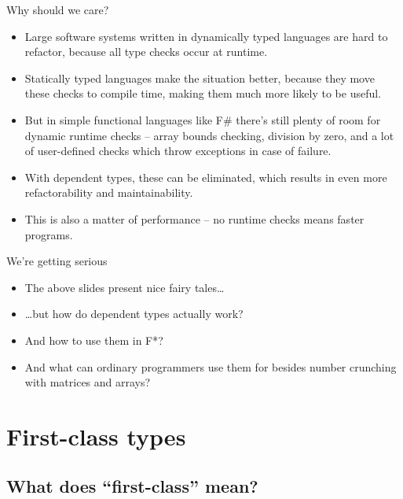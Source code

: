 \documentclass{beamer}
\begin{document}
\begin{frame}{Why should we care?}
\begin{itemize}
	\item Large software systems written in dynamically typed languages are hard to refactor, because all type checks occur at runtime.
	\item Statically typed languages make the situation better, because they move these checks to compile time, making them much more likely to be useful.
	\item But in simple functional languages like F\# there's still plenty of room for dynamic runtime checks -- array bounds checking, division by zero, and a lot of user-defined checks which throw exceptions in case of failure.
	\item With dependent types, these can be eliminated, which results in even more refactorability and maintainability.
	\item This is also a matter of performance -- no runtime checks means faster programs.
\end{itemize}
\end{frame}

\begin{frame}{We're getting serious}
\begin{itemize}
	\item The above slides present nice fairy tales\dots
	\item \dots but how do dependent types actually work?
	\item And how to use them in F*?
	\item And what can ordinary programmers use them for besides number crunching with matrices and arrays?
\end{itemize}
\end{frame}

\section{First-class types}

\subsection{What does ``first-class'' mean?}

\end{document}
